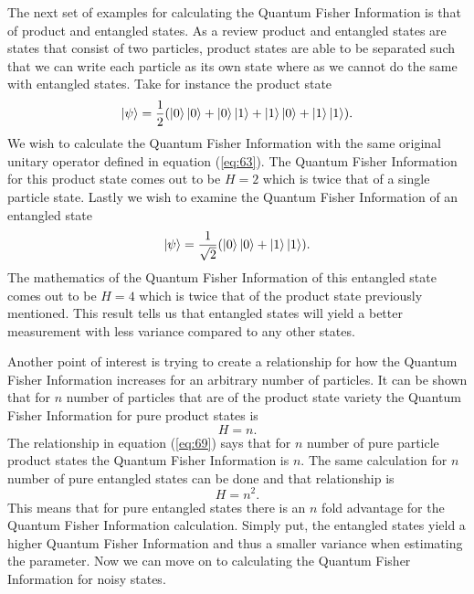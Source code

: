 \documentclass[twocolumn]{article}
\begin{document}
The next set of examples for calculating the Quantum Fisher Information is that of product and entangled states. As a review product and entangled states are states that consist of two particles, product states are able to be separated such that we can write each particle as its own state where as we cannot do the same with entangled states. Take for instance the product state 
\begin{equation} \label{eq:67}
\ket{\psi}=\frac{1}{2}(\ket{0}\ket{0}+\ket{0}\ket{1}+\ket{1}\ket{0}+\ket{1}\ket{1}).
\end{equation}
We wish to calculate the Quantum Fisher Information with the same original unitary operator defined in equation (\ref{eq:63}). The Quantum Fisher Information for this product state comes out to be $H=2$ which is twice that of a single particle state. Lastly we wish to examine the Quantum Fisher Information of an entangled state
\begin{equation} \label{eq:68}
\ket{\psi}=\frac{1}{\sqrt{2}}(\ket{0}\ket{0}+\ket{1}\ket{1}).
\end{equation}
The mathematics of the Quantum Fisher Information of this entangled state comes out to be $H=4$ which is twice that of the product state previously mentioned. This result tells us that entangled states will yield a better measurement with less variance compared to any other states.

Another point of interest is trying to create a relationship for how the Quantum Fisher Information increases for an arbitrary number of particles. It can be shown that for $n$ number of particles that are of the product state variety the Quantum Fisher Information for pure product states is
\begin{equation} \label{eq:69}
H=n.
\end{equation}
The relationship in equation (\ref{eq:69}) says that for $n$ number of pure particle product states the Quantum Fisher Information is $n$. The same calculation for $n$ number of pure entangled states can be done and that relationship is
\begin{equation} \label{eq:70}
H=n^2.
\end{equation}
This means that for pure entangled states there is an $n$ fold advantage for the Quantum Fisher Information calculation. Simply put, the entangled states yield a higher Quantum Fisher Information and thus a smaller variance when estimating the parameter. Now we can move on to calculating the Quantum Fisher Information for noisy states.
\end{document}
